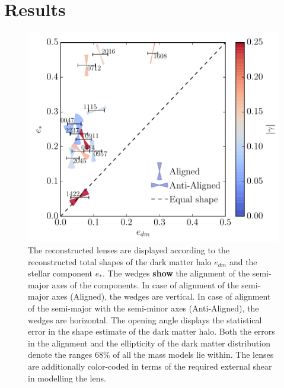 \documentclass[useAMS,usenatbib]{mn2e}
\newcommand{\cb}[1]{{\color{red} \textbf{#1}}}
\begin{document}
\section{Results}\label{sec:results}
\begin{figure}
  \centering
  \includegraphics[width=.8\linewidth]{Figures/wedges_shears.pdf}
  \caption[width=\linewidth]{The reconstructed lenses are displayed according to the reconstructed total shapes of the dark matter halo $e_{dm}$ and the stellar component $e_{*}$. The wedges \cb{show} the alignment of the semi-major axes of the components. In case of alignment of the semi-major axes (Aligned), the wedges are vertical. In case of alignment of the semi-major with the semi-minor axes (Anti-Aligned), the wedges are horizontal. The opening angle displays the statistical error in the shape estimate of the dark matter halo. Both the errors in the alignment and the ellipticity of the dark matter distribution denote the ranges $68\%$ of all the mass models lie within. The lenses are additionally color-coded in terms of the required external shear in modelling the lens.}
  \label{fig:wedgesall}
\end{figure}
\end{document}
